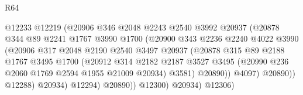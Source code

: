 \begin{lexlean}{R64}
\begin{coremodule}
                                    @12233
                                    @12219
                                    (@20906
                                      @346
                                      @2048
                                      @2243
                                      @2540
                                      @3992
                                      @20937
                                      (@20878
                                        @344
                                        @89
                                        @2241
                                        @1767
                                        @3990
                                        @1700
                                        (@20900
                                          @343
                                          @2236
                                          @2240
                                          @4022
                                          @3990
                                          (@20906
                                            @317
                                            @2048
                                            @2190
                                            @2540
                                            @3497
                                            @20937
                                            (@20878
                                              @315
                                              @89
                                              @2188
                                              @1767
                                              @3495
                                              @1700
                                              (@20912
                                                @314
                                                @2182
                                                @2187
                                                @3527
                                                @3495
                                                (@20990 @236 @2060 @1769 @2594 @1955 @21009 @20934)
                                                @3581)
                                              @20890))
                                          @4097)
                                        @20890))
                                    @12288)
                                  @20934)
                                @12294)
                              @20890))
                          @12300)
                        @20934)
                      @12306)

\end{coremodule}
\end{lexlean}
